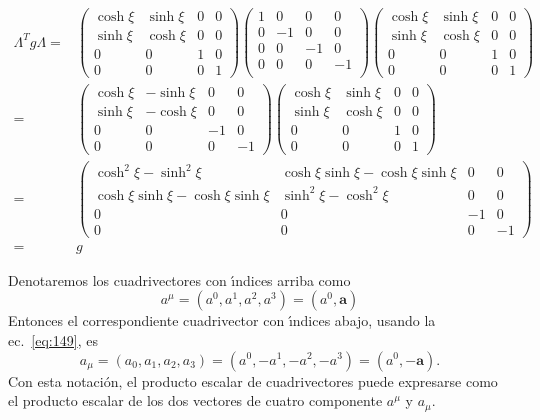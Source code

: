 \begin{align}
  \Lambda^T g \Lambda=&\begin{pmatrix}
    \cosh\xi&\sinh\xi&0&0\\
    \sinh\xi&\cosh\xi&0&0\\
    0     &  0  &1&0\\
    0     &  0  &0&1
  \end{pmatrix}
  \begin{pmatrix}
    1 & 0  & 0 &0\\
    0 & -1 & 0 &0\\
    0 & 0  & -1&0\\
    0 & 0  & 0 &-1\\
  \end{pmatrix}
  \begin{pmatrix}
    \cosh\xi&\sinh\xi&0&0\\
    \sinh\xi&\cosh\xi&0&0\\
    0     &  0  &1&0\\
    0     &  0  &0&1
  \end{pmatrix}\nonumber\\
  =&\begin{pmatrix}
       \cosh\xi&-\sinh\xi&0&0\\
    \sinh\xi&-\cosh\xi&0&0\\
    0     &  0  &-1&0\\
    0     &  0  &0&-1
  \end{pmatrix}
 \begin{pmatrix}
    \cosh\xi&\sinh\xi&0&0\\
    \sinh\xi&\cosh\xi&0&0\\
    0     &  0  &1&0\\
    0     &  0  &0&1
  \end{pmatrix}\nonumber\\
  =&\begin{pmatrix}
       \cosh^2\xi-\sinh^2\xi&\cosh\xi\sinh\xi-\cosh\xi\sinh\xi&0&0\\
    \cosh\xi\sinh\xi-\cosh\xi\sinh\xi&\sinh^2\xi-\cosh^2\xi&0&0\\
    0     &  0  &-1&0\\
    0     &  0  &0&-1
  \end{pmatrix}\nonumber\\
=&g
\end{align}

Denotaremos los cuadrivectores con \'\i ndices arriba como
\begin{equation}
  \label{eq:upindx}
  a^\mu=(a^0,a^1,a^2,a^3)=(a^0,\mathbf{a})
\end{equation}
Entonces el correspondiente cuadrivector con \'\i ndices abajo, usando la ec.~\eqref{eq:149}, es
\begin{equation}
  a_\mu=(a_0,a_1,a_2,a_3)=(a^0,-a^1,-a^2,-a^3)=(a^0,-\mathbf{a}).
\end{equation}
Con esta notaci\'on, el producto escalar de cuadrivectores puede expresarse como el producto escalar de los dos vectores de cuatro componente $a^\mu$ y $a_\mu$.
